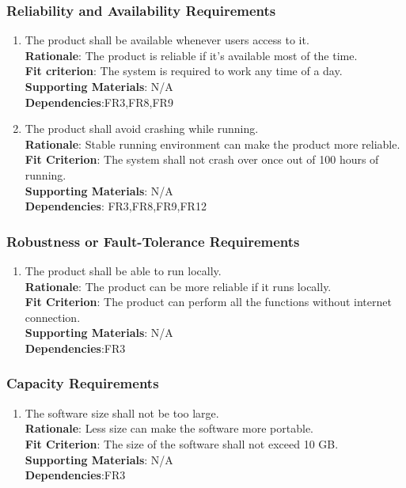 \documentclass{article}
\begin{document}
\subsubsection{Reliability and Availability Requirements}
\begin{enumerate}[PR4.1]
    \item The product shall be available whenever users access to it.\\
    \textbf{Rationale}: The product is reliable if it's available most of the time.\\
    \textbf{Fit criterion}: The system is required to work any time of a day.\\
\textbf{Supporting Materials}: N/A\\
\textbf{Dependencies}:FR3,FR8,FR9\\
    
    \item The product shall avoid crashing while running.\\
    \textbf{Rationale}: Stable running environment can make the product more reliable.\\
    \textbf{Fit Criterion}: The system shall not crash over once out of 100 hours of running.\\
\textbf{Supporting Materials}: N/A\\
\textbf{Dependencies}: FR3,FR8,FR9,FR12\\

\end{enumerate}
\subsubsection{Robustness or Fault-Tolerance Requirements}
\begin{enumerate}[PR5.1]
    \item The product shall be able to run locally.\\
    \textbf{Rationale}: The product can be more reliable if it runs locally.\\
    \textbf{Fit Criterion}: The product can perform all the functions without internet connection.\\
\textbf{Supporting Materials}: N/A\\
\textbf{Dependencies}:FR3\\

\end{enumerate}
\subsubsection{Capacity Requirements}
\begin{enumerate}[PR6.1]
    \item The software size shall not be too large.\\
    \textbf{Rationale}: Less size can make the software more portable.\\
    \textbf{Fit Criterion}: The size of the software shall not exceed 10 GB.\\
\textbf{Supporting Materials}: N/A\\
\textbf{Dependencies}:FR3\\

\end{enumerate}
\end{document}
